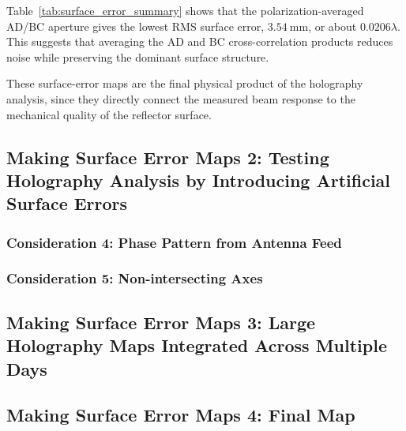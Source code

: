 \documentclass[12pt]{extarticle}
\begin{document}
Table~\ref{tab:surface_error_summary} shows that the polarization-averaged
AD/BC aperture gives the lowest RMS surface error, \(3.54~\mathrm{mm}\), or
about \(0.0206\lambda\). This suggests that averaging the AD and BC
cross-correlation products reduces noise while preserving the dominant surface
structure.

These surface-error maps are the final physical product of the holography
analysis, since they directly connect the measured beam response to the
mechanical quality of the reflector surface.
\subsection{Making Surface Error Maps 2: Testing Holography Analysis by Introducing Artificial Surface Errors}

\subsubsection{Consideration 4: Phase Pattern from Antenna Feed}\label{feed}
\subsubsection{Consideration 5: Non-intersecting Axes}
\subsection{Making Surface Error Maps 3: Large Holography Maps Integrated Across Multiple Days}
\subsection{Making Surface Error Maps 4: Final Map}

\printbibliography[heading=bibintoc,title={References}] 
\end{document}
